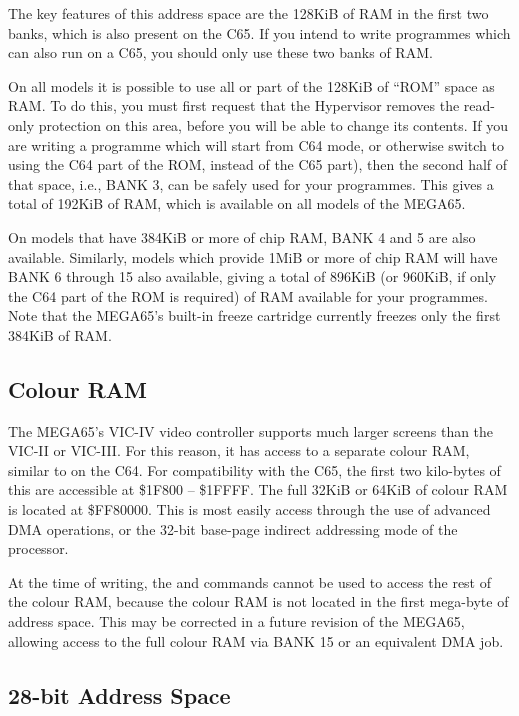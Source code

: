 The key features of this address space are the 128KiB of RAM in the first two banks, which is also present on
the C65. If you intend to write programmes which can also run on a C65, you should only use these two banks
of RAM.

On all models it is possible to use all or part of the 128KiB of ``ROM'' space as RAM. To do this, you must first
request that the Hypervisor removes the read-only protection on this area, before you will be able to change
its contents.  If you are writing a programme which will start from C64 mode, or otherwise switch to using the C64
part of the ROM, instead of the C65 part), then the second half of that space, i.e., BANK 3, can be safely used
for your programmes. This gives a total of 192KiB of RAM, which is available on all models of the MEGA65.

On models that have 384KiB or more of chip RAM, BANK 4 and 5 are also available.  Similarly, models which provide
1MiB or more of chip RAM will have BANK 6 through 15 also available, giving a total of 896KiB (or 960KiB, if only
the C64 part of the ROM is required) of RAM available for your programmes.  Note that the MEGA65's built-in
freeze cartridge currently freezes only the first 384KiB of RAM.

\subsection{Colour RAM}

The MEGA65's VIC-IV video controller supports much larger screens than the VIC-II or VIC-III. For this reason, it
has access to a separate colour RAM, similar to on the C64.  For compatibility with the C65, the first two kilo-bytes
of this are accessible at \$1F800 -- \$1FFFF.  The full 32KiB or 64KiB of colour RAM is located at \$FF80000.
This is most easily access through the use of advanced DMA operations, or the 32-bit base-page indirect addressing
mode of the processor.

At the time of writing, the  and  commands cannot be used to access the rest of the colour RAM, because the
colour RAM is not located in the first mega-byte of address space.  This may be corrected in a future revision of
the MEGA65, allowing access to the full colour RAM via BANK 15 or an equivalent DMA job. 

\subsection{28-bit Address Space}

